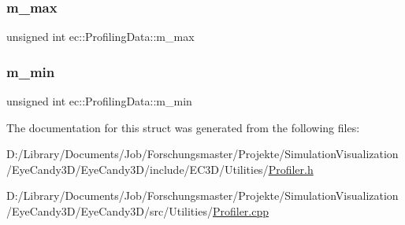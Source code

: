 \subsubsection{\texorpdfstring{m\+\_\+max}{m\_max}}
{\footnotesize\ttfamily unsigned int ec\+::\+Profiling\+Data\+::m\+\_\+max}

\mbox{\label{structec_1_1_profiling_data_a2dd2e0b50fb962c7b067906f60542dd5}} 
\subsubsection{\texorpdfstring{m\+\_\+min}{m\_min}}
{\footnotesize\ttfamily unsigned int ec\+::\+Profiling\+Data\+::m\+\_\+min}



The documentation for this struct was generated from the following files\+:\begin{DoxyCompactItemize}
\item 
D\+:/\+Library/\+Documents/\+Job/\+Forschungsmaster/\+Projekte/\+Simulation\+Visualization/\+Eye\+Candy3\+D/\+Eye\+Candy3\+D/include/\+E\+C3\+D/\+Utilities/\mbox{\hyperlink{_profiler_8h}{Profiler.\+h}}\item 
D\+:/\+Library/\+Documents/\+Job/\+Forschungsmaster/\+Projekte/\+Simulation\+Visualization/\+Eye\+Candy3\+D/\+Eye\+Candy3\+D/src/\+Utilities/\mbox{\hyperlink{_profiler_8cpp}{Profiler.\+cpp}}\end{DoxyCompactItemize}
